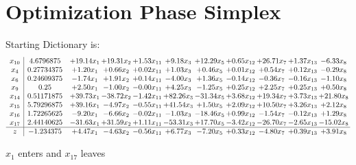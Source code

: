 \documentclass[9pt]{article}
\begin{document}
\section{Optimization Phase Simplex}
Starting Dictionary is:
\[\begin{array}{c| c c@{\hskip 2pt} c@{\hskip 2pt} c@{\hskip 2pt} c@{\hskip 2pt} c@{\hskip 2pt} c@{\hskip 2pt} c@{\hskip 2pt} c@{\hskip 2pt} c@{\hskip 2pt} }
 x_{10}   &  4.6796875 & + 19.14 x_{1} & + 19.31 x_{2} & +  1.53 x_{11} & +  9.18 x_{3} & + 12.29 x_{5} & +  0.65 x_{12} & + 26.71 x_{7} & +  1.37 x_{13} & -6.33 x_{8}\\
 x_{4}   &  0.27734375 & +  1.20 x_{1} & +  0.66 x_{2} & +  0.02 x_{11} & +  1.03 x_{3} & +  0.46 x_{5} & +  0.01 x_{12} & +  0.54 x_{7} & +  0.12 x_{13} & -0.29 x_{8}\\
 x_{6}   &  0.24609375 & -1.74 x_{1} & +  1.91 x_{2} & +  0.14 x_{11} & -4.00 x_{3} & +  1.36 x_{5} & -0.14 x_{12} & -0.36 x_{7} & -0.16 x_{13} & -1.10 x_{8}\\
 x_{9}   &  0.25 & +  2.50 x_{1} & -1.00 x_{2} & -0.00 x_{11} & +  4.25 x_{3} & -1.25 x_{5} & +  0.25 x_{12} & +  2.25 x_{7} & +  0.25 x_{13} & +  0.50 x_{8}\\
 x_{14}   &  0.51171875 & + 39.73 x_{1} & -38.72 x_{2} & -1.42 x_{11} & + 82.26 x_{3} & -31.34 x_{5} & +  3.68 x_{12} & + 19.34 x_{7} & +  3.73 x_{13} & + 21.80 x_{8}\\
 x_{15}   &  5.79296875 & + 39.16 x_{1} & -4.97 x_{2} & -0.55 x_{11} & + 41.54 x_{3} & +  1.50 x_{5} & +  2.09 x_{12} & + 10.50 x_{7} & +  3.26 x_{13} & +  2.12 x_{8}\\
 x_{16}   &  1.72265625 & -9.20 x_{1} & -6.66 x_{2} & -0.02 x_{11} & -1.03 x_{3} & -18.46 x_{5} & +  0.99 x_{12} & -1.54 x_{7} & -0.12 x_{13} & +  1.29 x_{8}\\
 x_{17}   &  2.44140625 & -31.63 x_{1} & + 31.59 x_{2} & +  1.11 x_{11} & -53.31 x_{3} & + 17.70 x_{5} & -3.42 x_{12} & -26.70 x_{7} & -2.65 x_{13} & -15.02 x_{8}\\
\hline
z    &  -1.234375 & +  4.47 x_{1} & -4.63 x_{2} & -0.56 x_{11} & +  6.77 x_{3} & -7.20 x_{5} & +  0.33 x_{12} & -4.80 x_{7} & +  0.39 x_{13} & +  3.91 x_{8}\\
\end{array}\]


 $ x_{1} $ enters and $ x_{17} $ leaves 
\end{document}
